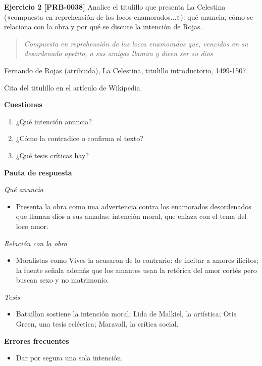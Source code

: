 \documentclass{book}
\begin{document}
\noindent\textbf{Ejercicio 2 [PRB-0038]}
Analice el titulillo que presenta La Celestina («compuesta en reprehensión de los locos enamorados...»): qué anuncia, cómo se relaciona con la obra y por qué se discute la intención de Rojas.


\begin{quote}
\itshape Compuesta en reprehensión de los locos enamorados que, vencidos en su desordenado apetito, a sus amigas llaman y dicen ser su dios
\end{quote}
{\noindent\footnotesize Fernando de Rojas (atribuida), La Celestina, titulillo introductorio, 1499-1507.\par}
{\noindent\footnotesize Cita del titulillo en el artículo de Wikipedia.\par}

\noindent\textbf{Cuestiones}
\begin{enumerate}
\item ¿Qué intención anuncia?
\item ¿Cómo la contradice o confirma el texto?
\item ¿Qué tesis críticas hay?
\end{enumerate}

\noindent\textbf{Pauta de respuesta}

\noindent\textit{Qué anuncia}
\begin{itemize}
\item Presenta la obra como una advertencia contra los enamorados desordenados que llaman dios a sus amadas: intención moral, que enlaza con el tema del loco amor.
\end{itemize}

\noindent\textit{Relación con la obra}
\begin{itemize}
\item Moralistas como Vives la acusaron de lo contrario: de incitar a amores ilícitos; la fuente señala además que los amantes usan la retórica del amor cortés pero buscan sexo y no matrimonio.
\end{itemize}

\noindent\textit{Tesis}
\begin{itemize}
\item Bataillon sostiene la intención moral; Lida de Malkiel, la artística; Otis Green, una tesis ecléctica; Maravall, la crítica social.
\end{itemize}

\noindent\textbf{Errores frecuentes}
\begin{itemize}
\item Dar por segura una sola intención.
\end{itemize}
\end{document}
